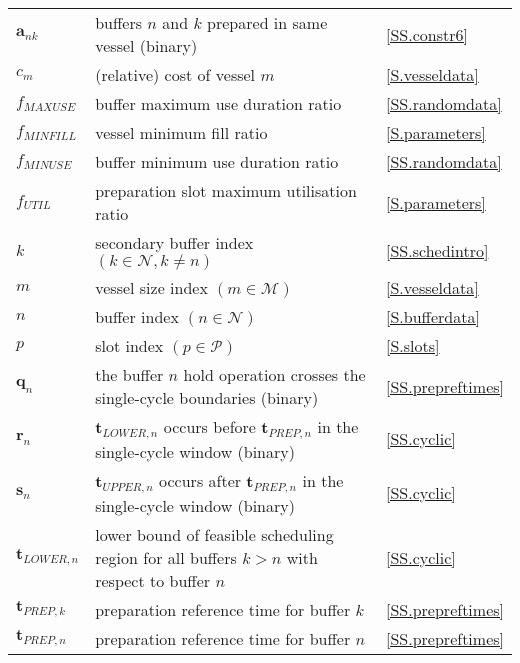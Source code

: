 {\begin{longtabu} to 
     &  & \\\hline
    \endhead
    $\boldsymbol{a}_{nk}$ & buffers $n$ and $k$ prepared in same
    vessel (binary) & \ref{SS.constr6}\\
    $c_{m}$ & (relative) cost of vessel $m$ & \ref{S.vesseldata}\\
    $f_{\mathit{MAXUSE}}$ & buffer maximum use duration ratio 
        & \ref{SS.randomdata}\\
    $f_{\mathit{MINFILL}}$ & vessel minimum fill ratio & \ref{S.parameters}\\
    $f_{\mathit{MINUSE}}$ & buffer minimum use duration ratio
        & \ref{SS.randomdata}\\
    $f_{\mathit{UTIL}}$ & preparation slot maximum utilisation ratio
        & \ref{S.parameters}\\
    $k$ & secondary buffer index $\left( k \in \mathcal{N}, k \ne n \right)$
        & \ref{SS.schedintro}\\
    $m$ & vessel size index $\left( m \in \mathcal{M} \right)$ 
        & \ref{S.vesseldata}\\
    $n$ & buffer index $\left( n \in \mathcal{N} \right)$ 
        & \ref{S.bufferdata}\\
    $p$ & slot index $\left( p \in \mathcal{P} \right)$ & \ref{S.slots}\\
    $\boldsymbol{q}_{n}$ & the buffer $n$ hold operation crosses the
        single-cycle boundaries (binary) & \ref{SS.prepreftimes}\\
    $\boldsymbol{r}_{n}$ & $\boldsymbol{t}_{\mathit{LOWER},n}$ occurs before
        $\boldsymbol{t}_{\mathit{PREP},n}$ in the single-cycle window (binary)
        & \ref{SS.cyclic}\\
    $\boldsymbol{s}_{n}$ &
        $\boldsymbol{t}_{\mathit{UPPER},n}$ occurs after
        $\boldsymbol{t}_{\mathit{PREP},n}$ in the single-cycle window (binary)
        & \ref{SS.cyclic}\\
    $\boldsymbol{t}_{\mathit{LOWER},n}$ & lower bound of feasible scheduling
        region for all buffers $k > n$ with respect to buffer $n$
        & \ref{SS.cyclic}\\
    $\boldsymbol{t}_{\mathit{PREP},k}$ & preparation reference time for buffer
        $k$ & \ref{SS.prepreftimes}\\
    $\boldsymbol{t}_{\mathit{PREP},n}$ & preparation reference time for buffer
        $n$ & \ref{SS.prepreftimes}\\

\end{longtabu}}

